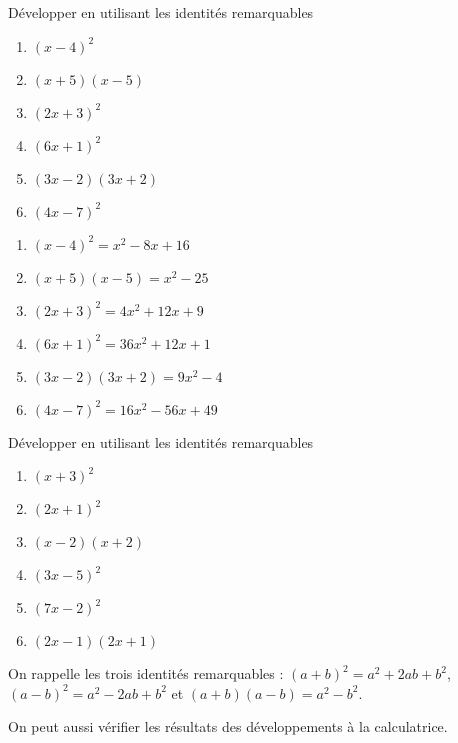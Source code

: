 \begin{exo}[type=solution] \label{dv2}
	Développer en utilisant les identités remarquables
	
\begin{multicols}{2}
	\begin{enumerate}[label=\bf{\alph*)\,}]		
\item		$(x-4)^2$		
\item		$(x+5)(x-5)$		
\item		$(2x+3)^2$		
\item		$(6x+1)^2$		
\item		$(3x-2)(3x+2)$		
\item		$(4x-7)^2$
\end{enumerate}		
\end{multicols}

\begin{sol}
\begin{enumerate}[label=\bf{\alph*)\,}]		
\item		$(x-4)^2 = x^2-8x+16$		
\item		$(x+5)(x-5)=x^2-25$		
\item		$(2x+3)^2=4x^2+12x+9$		
\item		$(6x+1)^2=36x^2+12x+1$		
\item		$(3x-2)(3x+2)=9x^2-4$		
\item		$(4x-7)^2=16x^2-56x+49$
\end{enumerate}		
\end{sol}	


\end{exo}





\begin{exo} \label{dv1}
Développer en utilisant les identités remarquables

\begin{multicols}{2}
\begin{enumerate}[label=\bf{\alph*)\,}]
\item $(x+3)^2$

\item $(2x+1)^2$

\item $(x-2)(x+2)$

\item $(3x-5)^2$

\item  $(7x-2)^2$

\item  $(2x-1)(2x+1)$

\end{enumerate}

\end{multicols}

\begin{sol*}
On rappelle les trois identités remarquables :
$(a+b)^2 = a^2+2ab+b^2$, $(a-b)^2 = a^2-2ab+b^2$ et $(a+b)(a-b) = a^2-b^2$.

On peut aussi vérifier les résultats des développements à la calculatrice. 
\end{sol*}

\end{exo}	




